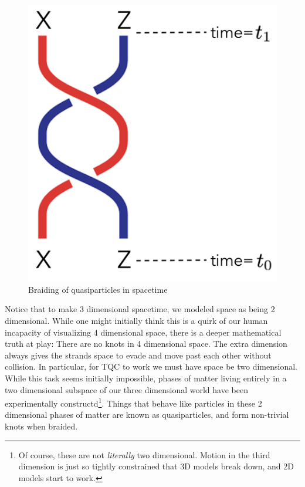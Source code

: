 \documentclass{article}
\theoremstyle{definition}
\numberwithin{figure}{section}
\begin{document}
\begin{figure}
\begin{center}
\includegraphics[scale=0.25]{braiding}
\caption{Braiding of quasiparticles in spacetime}
\label{fig:braiding}
\end{center}
\end{figure}

Notice that to make 3 dimensional spacetime, we modeled space as being 2 dimensional. While one might initially think this is a quirk of our human incapacity of visualizing 4 dimensional space, there is a deeper mathematical truth at play: There are no knots in 4 dimensional space. The extra dimension always gives the strands space to evade and move past each other without collision. In particular, for TQC to work we must have space be two dimensional. While this task seems initially impossible, phases of matter living entirely in a two dimensional subspace of our three dimensional world have been experimentally constructd\footnote{Of course, these are not \textit{literally} two dimensional. Motion in the third dimension is just so tightly constrained that $3$D models break down, and $2$D models start to work.}. Things that behave like particles in these 2 dimensional phases of matter are known as quasiparticles, and form non-trivial knots when braided.
\end{document}
